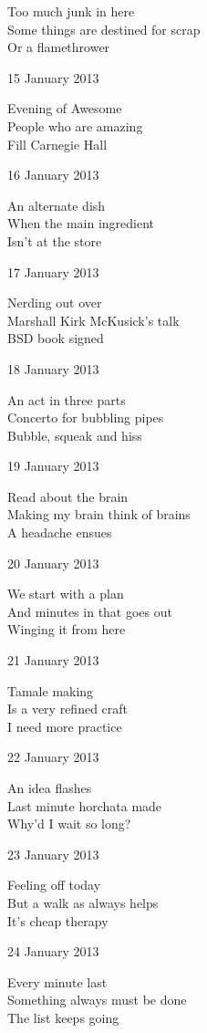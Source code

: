 \documentclass[12pt]{article}
\begin{document}
Too much junk in here \\
Some things are destined for scrap \\
Or a flamethrower

15 January 2013

Evening of Awesome \\
People who are amazing \\
Fill Carnegie Hall

16 January 2013

An alternate dish \\
When the main ingredient \\
Isn't at the store

17 January 2013

Nerding out over \\
Marshall Kirk McKusick's talk \\
BSD book signed

\newpage

18 January 2013

An act in three parts \\
Concerto for bubbling pipes \\
Bubble, squeak and hiss

19 January 2013

Read about the brain \\
Making my brain think of brains \\
A headache ensues

20 January 2013

We start with a plan \\
And minutes in that goes out \\
Winging it from here

21 January 2013

Tamale making \\
Is a very refined craft \\
I need more practice

22 January 2013

An idea flashes \\
Last minute horchata made \\
Why'd I wait so long?

23 January 2013

Feeling off today \\
But a walk as always helps \\
It's cheap therapy

24 January 2013
 
Every minute last \\
Something always must be done \\
The list keeps going
\end{document}
